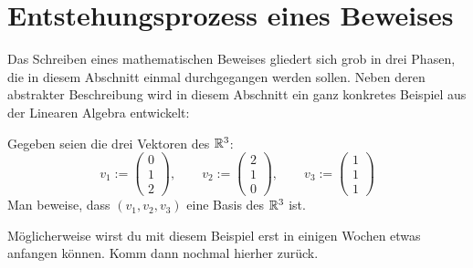 \section{Entstehungsprozess eines Beweises}
 Das Schreiben eines mathematischen Beweises gliedert sich grob in drei Phasen, die in diesem Abschnitt einmal durchgegangen werden sollen.  Neben deren abstrakter Beschreibung wird in diesem Abschnitt ein ganz konkretes Beispiel aus der Linearen Algebra entwickelt:
 \begin{bsp}
  Gegeben seien die drei Vektoren des ${\mathbb R}^3$:
  \[ v_1:= \begin{pmatrix} 0 \\ 1 \\ 2 \end{pmatrix},\qquad  v_2:= \begin{pmatrix} 2 \\ 1 \\ 0 \end{pmatrix},\qquad v_3:= \begin{pmatrix} 1 \\ 1 \\ 1 \end{pmatrix}\]
  Man beweise, dass $(v_1,v_2,v_3)$ eine Basis des ${\mathbb R}^3$ ist.
 \end{bsp}
Möglicherweise wirst du mit diesem Beispiel erst in einigen Wochen etwas anfangen können. Komm dann nochmal hierher zurück.


